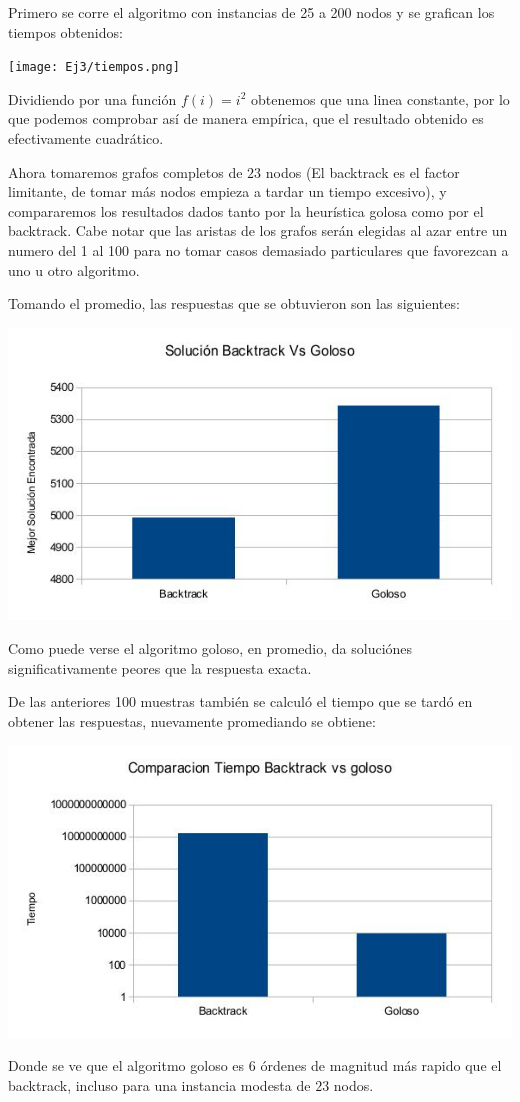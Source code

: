 Primero se corre el algoritmo con instancias de 25 a 200 nodos y se grafican los tiempos obtenidos:

\texttt{[image: Ej3/tiempos.png]}

Dividiendo por una función $f(i) = i^2$ obtenemos que una linea constante, por lo que podemos comprobar así de manera empírica, que el resultado obtenido es efectivamente cuadrático.

Ahora tomaremos grafos completos de $23$ nodos (El backtrack es el factor limitante, de tomar más nodos empieza a tardar un tiempo excesivo), y compararemos los resultados dados tanto por la heurística golosa como por el backtrack. Cabe notar que las aristas de los grafos serán elegidas al azar entre un numero del 1 al 100 para no tomar casos demasiado particulares que favorezcan a uno u otro algoritmo.

Tomando el promedio, las respuestas que se obtuvieron son las siguientes:

\includegraphics[scale=0.5]{Ej3/Soluciones.jpg}

Como puede verse el algoritmo goloso, en promedio, da soluciónes significativamente peores que la respuesta exacta.

De las anteriores 100 muestras también se calculó el tiempo que se tardó en obtener las respuestas, nuevamente promediando se obtiene:

\includegraphics[scale=0.5]{Ej3/tiempos.jpg}

Donde se ve que el algoritmo goloso es $6$ órdenes de magnitud más rapido que el backtrack, incluso para una instancia modesta de $23$ nodos.